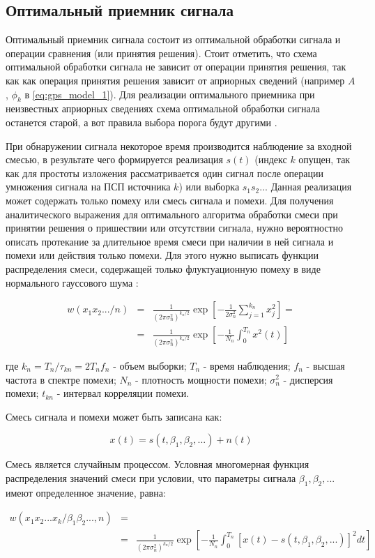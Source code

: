 \subsection{Оптимальный приемник сигнала}
Оптимальный приемник сигнала состоит из оптимальной обработки сигнала и операции сравнения (или принятия решения). Стоит отметить,
что схема оптимальной обработки сигнала не зависит от операции принятия решения, так как как операция принятия решения зависит от
априорных сведений (например $A$, $\phi_k$ в \ref{eq:gps_model_1}). Для реализации оптимального приемника при неизвестных априорных
сведениях схема оптимальной обработки сигнала останется старой, а вот правила выбора порога будут другими \cite{pestryakov-book}.

При обнаружении сигнала некоторое время производится наблюдение за входной смесью, в результате чего формируется реализация $s(t)$ (индекс $k$
опущен, так как для простоты изложения рассматривается один сигнал после операции умножения сигнала на ПСП источника $k$) или
выборка $s_{1}s_{2}...$ Данная реализация может содержать только помеху или смесь сигнала и помехи. Для получения аналитического
выражения для оптимального алгоритма обработки смеси при принятии решения о пришествии или отсутствии сигнала,
нужно вероятностно описать протекание за длительное время смеси при наличии в ней сигнала и помехи или действия только помехи. Для
этого нужно выписать функции распределения смеси, содержащей только флуктуационную помеху в виде нормального гауссового шума \cite{pestryakov-book}:
\begin{center}
\begin{eqnarray}
	\label{eq:just_noise}
	w(x_{1}x_{2}.../n) & = & \frac{1}{(2\pi\sigma_{n}^{2})^{k_n/2}}\exp[-\frac{1}{2\sigma_{n}^{2}}\sum_{j=1}^{k_n}x_{j}^2] = \\
			& = & \frac{1}{(2\pi\sigma_{n}^{2})^{k_n/2}}\exp[-\frac{1}{N_n}\int_{0}^{T_n}x^2(t)] \nonumber
\end{eqnarray}
\end{center}
где $k_n=T_n/\tau_{kn}=2T_nf_{n}$ - объем выборки; ${T_n}$ - время наблюдения; ${f_{n}}$ - высшая частота в спектре помехи;
${N_n}$ - плотность мощности помехи; ${\sigma_{n}^{2}}$ - дисперсия помехи; ${t_{kn}}$ - интервал корреляции помехи.

Смесь сигнала и помехи может быть записана как:
\begin{center}
\begin{equation}
	\label{eq:signal_and_noise}
	x(t) = s(t, \beta_1, \beta_2, ...) + n(t)
\end{equation}
\end{center}
Смесь является случайным процессом. Условная многомерная функция распределения значений смеси при условии, что параметры
сигнала ${\beta_1, \beta_2, ...}$ имеют определенное значение, равна:
\begin{center}
\begin{eqnarray}
	\label{eq:signal_and_noise2}
	w(x_{1}x_{2}...x_{k}/\beta_1 \beta_2 ..., n) & = & \\
	& = & \frac{1}{(2\pi\sigma_{n}^{2})^{k_n/2}}\exp[-\frac{1}{N_n}\int_{0}^{T_n}[x(t) - s(t, \beta_1, \beta_2, ...)]^2 dt] \nonumber
\end{eqnarray}
\end{center}


